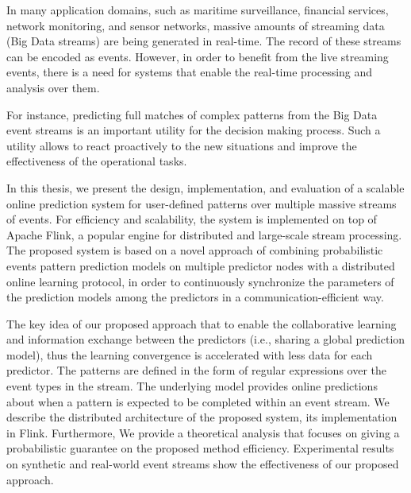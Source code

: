 
\par In many application domains, such as maritime surveillance, financial services, network monitoring, and sensor networks, massive amounts of streaming data (Big Data streams) are being generated in real-time. The record of these streams can be encoded as events.  However, in order to benefit from the live streaming events, there is a need for systems that enable the real-time processing and analysis over them.


 
 For instance, predicting full matches of complex patterns from the Big Data event streams is an important utility for the decision making process. Such a utility allows to react proactively to the new situations and improve the effectiveness of the operational tasks.

\par In this thesis, we present the design, implementation, and evaluation of a scalable online prediction system for user-defined patterns over multiple massive streams of events. For efficiency and scalability, the system is implemented on top of Apache Flink, a popular engine for distributed and large-scale stream processing. The proposed system is based on a novel approach of combining probabilistic events pattern prediction models on multiple predictor nodes with a distributed online learning protocol, in order to continuously synchronize the parameters of the prediction models among the predictors in a communication-efficient way. 

\par  The key idea of our proposed approach that to enable the collaborative learning and information exchange  between the predictors (i.e., sharing a global prediction model), thus the learning convergence is accelerated with less data for each predictor. The patterns are defined in the form of regular expressions over the event types in the stream. The underlying model provides online predictions about when a pattern is expected to be completed within an event stream. We describe the distributed architecture of the proposed system, its implementation in Flink.  Furthermore, We provide a theoretical analysis that focuses on giving a probabilistic guarantee on the proposed method efficiency.  Experimental results on synthetic and real-world event streams show the effectiveness of our proposed approach.

